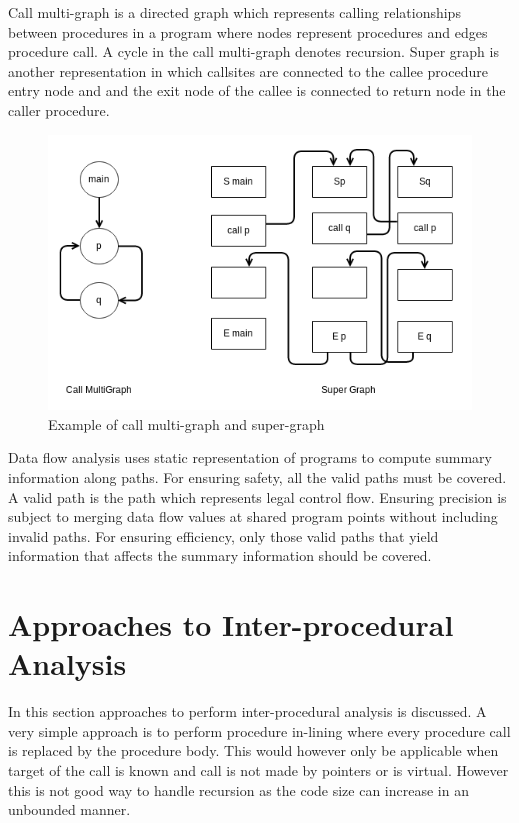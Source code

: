 Call multi-graph is a directed graph which represents calling relationships between procedures in a program where nodes represent procedures and edges procedure call. A cycle in the call multi-graph denotes recursion. Super graph is another representation in which callsites are connected to the callee procedure entry node and and the exit node of the callee is connected to return node in the caller procedure. \\     

\begin{figure}[here]
	\begin{center}
		\includegraphics[scale=0.5]{Figures/callgraph.png}
	\end{center}
	\caption{Example of call multi-graph and super-graph}
	\label{fig:call graph}
\end{figure}

Data flow analysis uses static representation of programs to compute summary information along paths. For ensuring safety, all the valid paths must be covered. A valid path is the path which represents legal control flow. Ensuring precision is subject to merging data flow values at shared program points without including invalid paths. For ensuring efficiency, only those valid paths that yield information that affects the summary information should be covered.

\section{Approaches to Inter-procedural Analysis}

In this section approaches to perform inter-procedural analysis is discussed. A very simple approach is to perform procedure in-lining where every procedure call is replaced by the procedure body. This would however only be applicable when target of the call is known and call is not made by pointers or is virtual. However this is not good way to handle recursion as the code size can increase in an unbounded manner. \\

